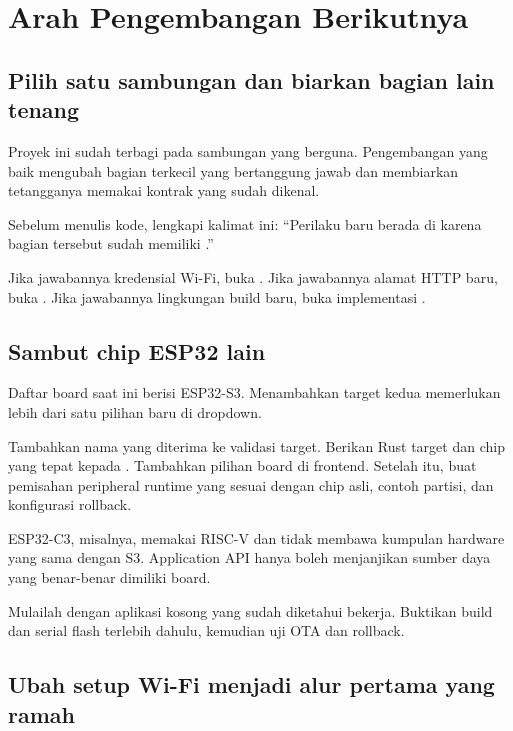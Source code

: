 \chapter{Arah Pengembangan Berikutnya}

\section{Pilih satu sambungan dan biarkan bagian lain tenang}

Proyek ini sudah terbagi pada sambungan yang berguna. Pengembangan yang baik mengubah bagian terkecil yang bertanggung jawab dan membiarkan tetangganya memakai kontrak yang sudah dikenal.

Sebelum menulis kode, lengkapi kalimat ini: ``Perilaku baru berada di \underline{\hspace{4cm}} karena bagian tersebut sudah memiliki \underline{\hspace{4cm}}.''

Jika jawabannya kredensial Wi-Fi, buka . Jika jawabannya alamat HTTP baru, buka . Jika jawabannya lingkungan build baru, buka implementasi .

\section{Sambut chip ESP32 lain}

Daftar board saat ini berisi ESP32-S3. Menambahkan target kedua memerlukan lebih dari satu pilihan baru di dropdown.

Tambahkan nama yang diterima ke validasi target. Berikan Rust target dan chip  yang tepat kepada . Tambahkan pilihan board di frontend. Setelah itu, buat pemisahan peripheral runtime yang sesuai dengan chip asli, contoh partisi, dan konfigurasi rollback.

ESP32-C3, misalnya, memakai RISC-V dan tidak membawa kumpulan hardware yang sama dengan S3. Application API hanya boleh menjanjikan sumber daya yang benar-benar dimiliki board.

Mulailah dengan aplikasi kosong yang sudah diketahui bekerja. Buktikan build dan serial flash terlebih dahulu, kemudian uji OTA dan rollback.

\section{Ubah setup Wi-Fi menjadi alur pertama yang ramah}

